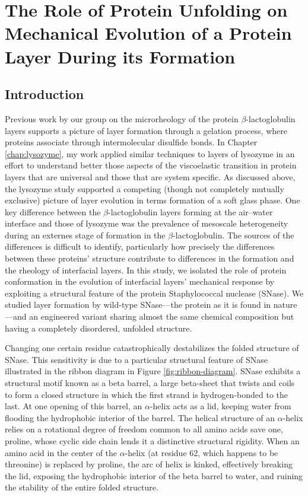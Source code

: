 \chapter{\label{chap:snase}The Role of Protein Unfolding on Mechanical Evolution of a Protein Layer During its Formation}

\section{Introduction}

Previous work by our group on the microrheology of the protein $\beta$-lactoglobulin layers\cite{Lee2010} supports a picture of layer formation through a gelation process, where proteins associate through intermolecular disulfide bonds. In Chapter \ref{chap:lysozyme}, my work applied similar techniques to layers of lysozyme in an effort to understand better those aspects of the viscoelastic transition in protein layers that are universal and those that are system specific. As discussed above, the lysozyme study supported a competing (though not completely mutually exclusive) picture of layer evolution in terms formation of a soft glass phase. One key difference between the $\beta$-lactoglobulin layers forming at the air--water interface and those of lysozyme was the prevalence of mesoscale heterogeneity during an externes stage of formation in the $\beta$-lactoglobulin. The sources of the differences is difficult to identify, particularly how precisely the differences between these proteins' structure contribute to differences in the formation and the rheology of interfacial layers. In this study, we isolated the role of protein conformation in the evolution of interfacial layers' mechanical response by exploiting a structural feature of the protein Staphylococcal nuclease (SNase). We studied layer formation by wild-type SNase---the protein as it is found in nature---and an engineered variant sharing almost the same chemical composition but having a completely disordered, unfolded structure.

Changing one certain residue catastrophically destabilizes the folded structure of SNase. This sensitivity is due to a particular structural feature of SNase illustrated in the ribbon diagram in Figure \ref{fig:ribbon-diagram}. SNase exhibits a structural motif known as a beta barrel, a large beta-sheet that twists and coils to form a closed structure in which the first strand is hydrogen-bonded to the last. At one opening of this barrel, an $\alpha$-helix acts as a lid, keeping water from flooding the hydrophobic interior of the barrel. The helical structure of an $\alpha$-helix relies on a rotational degree of freedom common to all amino acids save one, proline, whose cyclic side chain lends it a distinctive structural rigidity. When an amino acid in the center of the $\alpha$-helix (at residue 62, which happens to be threonine) is replaced by proline, the arc of helix is kinked, effectively breaking the lid, exposing the hydrophobic interior of the beta barrel to water, and ruining the stability of the entire folded structure.

